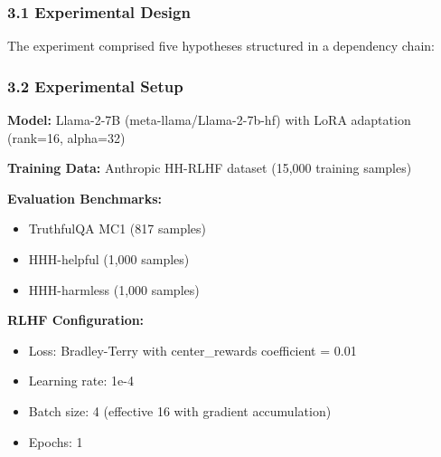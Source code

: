 
\subsubsection{3.1 Experimental Design}

The experiment comprised five hypotheses structured in a dependency chain:

\begin{table}[htbp]
\centering
{}
\end{table}

\subsubsection{3.2 Experimental Setup}

\textbf{Model:} Llama-2-7B (meta-llama/Llama-2-7b-hf) with LoRA adaptation (rank=16, alpha=32)

\textbf{Training Data:} Anthropic HH-RLHF dataset (15,000 training samples)

\textbf{Evaluation Benchmarks:}
\begin{itemize}
\item TruthfulQA MC1 (817 samples)
\item HHH-helpful (1,000 samples)
\item HHH-harmless (1,000 samples)
\end{itemize}

\textbf{RLHF Configuration:}
\begin{itemize}
\item Loss: Bradley-Terry with center\_rewards coefficient = 0.01
\item Learning rate: 1e-4
\item Batch size: 4 (effective 16 with gradient accumulation)
\item Epochs: 1
\end{itemize}

